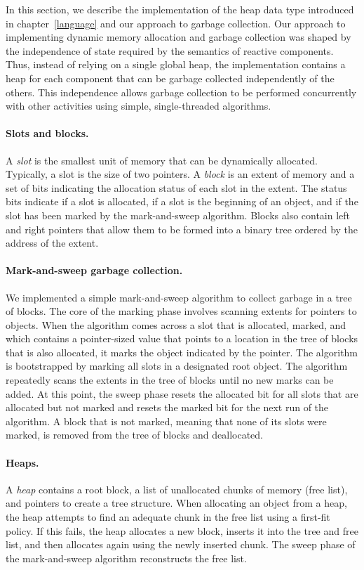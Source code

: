 In this section, we describe the implementation of the heap data type introduced in chapter~\ref{language} and our approach to garbage collection.
Our approach to implementing dynamic memory allocation and garbage collection was shaped by the independence of state required by the semantics of reactive components.
Thus, instead of relying on a single global heap, the implementation contains a heap for each component that can be garbage collected independently of the others.
This independence allows garbage collection to be performed concurrently with other activities using simple, single-threaded algorithms.

\paragraph{Slots and blocks.}
A \emph{slot} is the smallest unit of memory that can be dynamically allocated.
Typically, a slot is the size of two pointers.
A \emph{block} is an extent of memory and a set of bits indicating the allocation status of each slot in the extent.
The status bits indicate if a slot is allocated, if a slot is the beginning of an object, and if the slot has been marked by the mark-and-sweep algorithm.
Blocks also contain left and right pointers that allow them to be formed into a binary tree ordered by the address of the extent.

\paragraph{Mark-and-sweep garbage collection.}
We implemented a simple mark-and-sweep algorithm to collect garbage in a tree of blocks.
The core of the marking phase involves scanning extents for pointers to objects.
When the algorithm comes across a slot that is allocated, marked, and which contains a pointer-sized value that points to a location in the tree of blocks that is also allocated, it marks the object indicated by the pointer.
The algorithm is bootstrapped by marking all slots in a designated root object.
The algorithm repeatedly scans the extents in the tree of blocks until no new marks can be added.
At this point, the sweep phase resets the allocated bit for all slots that are allocated but not marked and resets the marked bit for the next run of the algorithm.
A block that is not marked, meaning that none of its slots were marked, is removed from the tree of blocks and deallocated.

\paragraph{Heaps.}
A \emph{heap} contains a root block, a list of unallocated chunks of memory (free list), and pointers to create a tree structure.
When allocating an object from a heap, the heap attempts to find an adequate chunk in the free list using a first-fit policy.
If this fails, the heap allocates a new block, inserts it into the tree and free list, and then allocates again using the newly inserted chunk.
The sweep phase of the mark-and-sweep algorithm reconstructs the free list.


